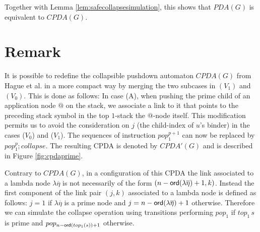 \documentclass[a4paper]{article}
\theoremstyle{remark}
\theoremstyle{definition}
\begin{document}
Together with Lemma \ref{lem:safecollapsesimulation}, this shows that $PDA(G)$ is equivalent to $CPDA(G)$.



\section{Remark}
It is possible to redefine the collapsible pushdown automaton $CPDA(G)$ from Hague et al.
\cite{hmos-lics08} in a more compact way by merging the two subcases in
$(V_1)$ and $(V_0)$. This is done as follows: In case (A), when
pushing the prime child of an application node $@$ on the stack, we
associate a link to it that points to the preceding stack symbol in
the top $1$-stack \ie the $@$-node itself.
 This modification permits us to avoid the consideration on $j$ (the child-index of $u$'s binder) in the
 cases ($V_0$) and ($V_1$). The sequences of instruction $pop_1^{p+1}$ can now be replaced by
 $pop_1^p ; collapse$. The resulting CPDA is denoted by $CPDA'(G)$ and is described in
Figure \ref{fig:cpdaprime}.
\begin{figure}
\begin{center}
\end{center}
\end{figure}
Contrary to $CPDA(G)$, in a configuration of this CPDA the link associated to a lambda node $\lambda\overline\eta$ is not necessarily of the form
$(n-{\sf ord}(\lambda\overline\eta)+1,k)$. Instead the first component of the link pair $(j,k)$ associated to a lambda node is defined as follows:
$j = 1$ if $\lambda\overline\eta$ is a prime node and $j=n-{\sf ord}(\lambda\overline\eta)+1$ otherwise. Therefore we can simulate the collapse operation
using transitions performing $pop_1$ if $top_1\, s$ is prime and $pop_{n-{\sf ord}(top_1(s))+1}$ otherwise.




\end{document}
